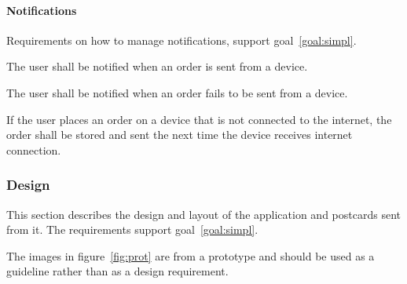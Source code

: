 \documentclass[10pt,a4paper]{article}
\begin{document}
\paragraph{Notifications}
Requirements on how to manage notifications, support goal~\ref{goal:simpl}.

\begin{description}
	\item [Req \thesubsubsection {.\theproduct} Success notification] The user shall be notified when an order is sent from a device.
	\item [Req \thesubsubsection {.\theproduct} Fail notification] The user shall be notified when an order fails to be sent from a device.

	\item [Req \thesubsubsection {.\theproduct} No internet] If the user places an order on a device that is not connected to the internet, the order shall be stored and sent the next time the device receives internet connection. 
\end{description}

\subsubsection{Design}
This section describes the design and layout of the application and postcards sent from it. The requirements support goal~\ref{goal:simpl}. 

The images in figure~\ref{fig:prot} are from a prototype and should be used as a guideline rather than as a design requirement.
\end{document}
